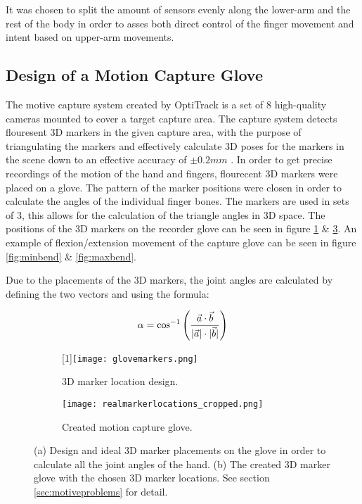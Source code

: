 \documentclass[../main.tex]{subfiles}
\begin{document}
It was chosen to split the amount of sensors evenly along the lower-arm and the rest of the body in order to asses both direct control of the finger movement and intent based on upper-arm movements.

\subsection{Design of a Motion Capture Glove}
\label{sec:motiveglove}

The motive capture system created by OptiTrack \cite{motive} is a set of 8 high-quality cameras mounted to cover a target capture area.
The capture system detects flouresent 3D markers in the given capture area, with the purpose of triangulating the markers and effectively calculate 3D poses for the markers in the scene down to an effective accuracy of $\pm 0.2mm$ .
In order to get precise recordings of the motion of the hand and fingers, flourecent 3D markers were placed on a glove.
The pattern of the marker positions were closen in order to calculate the angles of the individual finger bones.
The markers are used in sets of 3, this allows for the calculation of the triangle angles in 3D space.
The positions of the 3D markers on the recorder glove can be seen in figure \ref{fig:markerdesign} \& \ref{fig:realmarkers}.
An example of \gls{flexion/extension} movement of the capture glove can be seen in figure \ref{fig:minbend} \& \ref{fig:maxbend}.

Due to the placements of the 3D markers, the joint angles are calculated by defining the two vectors and using the formula:

\[
\alpha = \cos^{-1}\left({\frac{\vec{a} \cdot \vec{b}}{ \lvert \vec{a} \rvert \cdot \lvert \vec{b} \rvert }}\right)
\]


\begin{figure}[H]
    \centering
    \begin{subfigure}[b]{0.49\textwidth}
        \centering
        \scalebox{-1}[1]{\texttt{[image: glovemarkers.png]}}
        \caption{3D marker location design.}
        \label{fig:markerdesign}
    \end{subfigure}
    \hfill
    \centering
    \begin{subfigure}[b]{0.49\textwidth}
        \centering
        \texttt{[image: realmarkerlocations\_cropped.png]}
        \caption{Created motion capture glove.}
        \label{fig:realmarkers}
    \end{subfigure}
    \caption{(a) Design and ideal 3D marker placements on the glove in order to calculate all the joint angles of the hand. (b) The created 3D marker glove with the chosen 3D marker locations. See section \ref{sec:motiveproblems} for detail.}
\end{figure}
\end{document}
